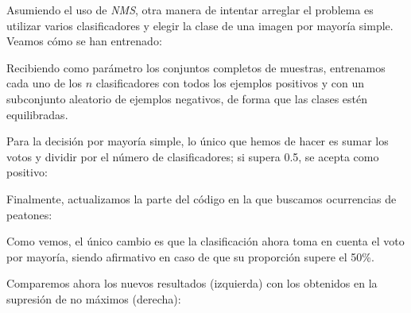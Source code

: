 \documentclass[11pt,a4paper]{article}
\begin{document}
                \par
                Asumiendo el uso de \textit{NMS}, otra manera de intentar arreglar el problema es utilizar varios clasificadores y elegir la clase de una imagen por mayoría simple. Veamos cómo se han entrenado:


                \par
                Recibiendo como parámetro los conjuntos completos de muestras, entrenamos cada uno de los $n$ clasificadores con todos los ejemplos positivos y con un subconjunto aleatorio de ejemplos negativos, de forma que las clases estén equilibradas.

                \par
                Para la decisión por mayoría simple, lo único que hemos de hacer es sumar los votos y dividir por el número de clasificadores; si supera 0.5, se acepta como positivo:


                \par
                Finalmente, actualizamos la parte del código en la que buscamos ocurrencias de peatones:


                \par
                Como vemos, el único cambio es que la clasificación ahora toma en cuenta el voto por mayoría, siendo afirmativo en caso de que su proporción supere el 50\%.

                \par
                Comparemos ahora los nuevos resultados (izquierda) con los obtenidos en la supresión de no máximos (derecha):
\end{document}
